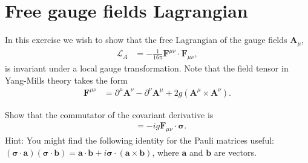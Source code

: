 \documentclass[working, oneside]{../../../Preambles/tuftebook}
\begin{document}
\let\cleardoublepage\clearpage
\thispagestyle{fancy}
\chapter{Free gauge fields Lagrangian}
In this exercise we wish to show that the free Lagrangian of the gauge fields \( \mathbf{A}_\mu \),
\begin{align*}
\mathcal{L}_A &= -\frac{1}{16\pi} \mathbf{F}^{\mu\nu} \cdot \mathbf{F}_{\mu\nu}, \tag{9}
\end{align*}
is invariant under a local gauge transformation. Note that the field tensor in Yang-Mills theory takes the form
\begin{align*}
\mathbf{F}^{\mu\nu} &= \partial^\mu \mathbf{A}^\nu - \partial^\nu \mathbf{A}^\mu + 2g (\mathbf{A}^\mu \times \mathbf{A}^\nu). \tag{10}
\end{align*}

\begin{exercise}[1]
Show that the commutator of the covariant derivative is
\begin{align*}
[D_\mu, D_\nu] &= -ig \mathbf{F}_{\mu\nu} \cdot \boldsymbol{\sigma}. \tag{11}
\end{align*}
Hint: You might find the following identity for the Pauli matrices useful: \( (\boldsymbol{\sigma} \cdot \mathbf{a})(\boldsymbol{\sigma} \cdot \mathbf{b}) = \mathbf{a} \cdot \mathbf{b} + i \boldsymbol{\sigma} \cdot (\mathbf{a} \times \mathbf{b}) \), where \( \mathbf{a} \) and \( \mathbf{b} \) are vectors.
\end{exercise}
\end{document}
